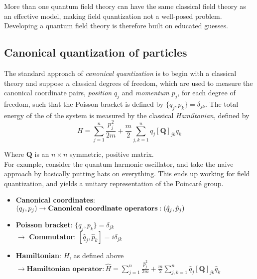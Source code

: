 \noindent More than one quantum field theory can have the same classical field theory as an effective model, making field quantization not a well-posed problem. Developing a quantum field theory is therefore built on educated guesses.

\subsection*{Canonical quantization of particles} 
 
\noindent The standard approach of \textit{canonical quantization} is to begin with a classical theory and suppose $n$ classical degrees of freedom, which are used to measure the canonical coordinate pairs, \textit{position} $q_j$ and \textit{momentum} $p_j$, for each degree of freedom, such that the Poisson bracket is defined by $\{q_j, p_k \} = \delta_{jk}$. The total energy of the of the system is measured by the classical \textit{Hamiltonian}, defined by 
\begin{equation}
H = \sum_{j=1}^n \frac{p_j^2}{2 m} + \frac{m}{2} \sum_{j, k=1}^n q_j [\textbf{Q}]_{jk} q_k
\end{equation}

\noindent Where $\textbf{Q}$ is an $n \times n$ symmetric, positive matrix. \\

\noindent For example, consider the quantum harmonic oscillator, and take the naive approach by basically putting hats on everything. This ends up working for field quantization, and yields a unitary representation of the Poincar\'e group. \\

\begin{itemize}
\item \textbf{Canonical coordinates}: $(q_j, p_j) \\ \rightarrow \textbf{Canonical coordinate operators}: (\hat{q}_j, \hat{p}_j)$ \\
\item \textbf{Poisson bracket}: $\{ q_j, p_k \} = \delta_{jk}$ \\ $\rightarrow$ \textbf{Commutator}: $[\hat{q}_j, \hat{p}_k] = i \delta_{jk}$ \\
\item \textbf{Hamiltonian}: $H$, as defined above \\ $\rightarrow \textbf{Hamiltonian operator}: \hat{H} = \sum_{j=1}^n \frac{\hat{p}_j^2}{2 m} + \frac{m}{2} \sum_{j, k=1}^n \hat{q}_j [\textbf{Q}]_{jk} \hat{q}_k$
\end{itemize}

